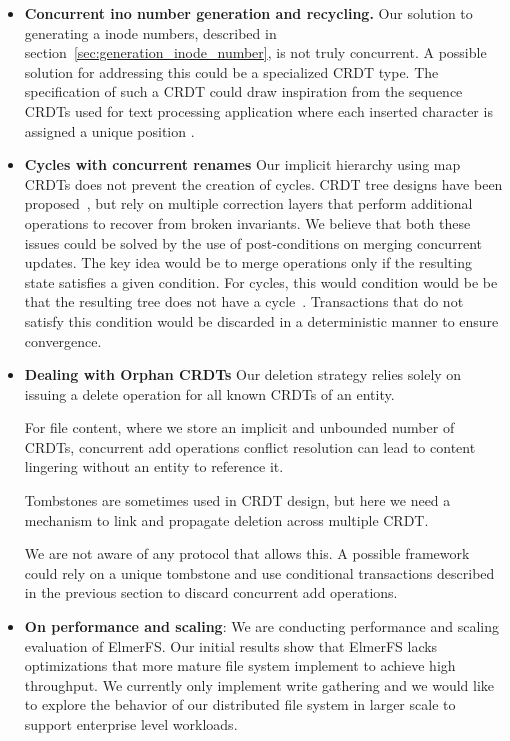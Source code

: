 \documentclass[sigconf, anonymous, 10pt]{acmart}
\begin{document}
\begin{itemize}
    \item \textbf{Concurrent ino number generation and recycling.}
    Our solution to generating a inode numbers, described in section~\ref{sec:generation_inode_number},
    is not truly concurrent.
    A possible solution for addressing this could be a specialized CRDT type.
    The specification of such a CRDT could draw inspiration from the sequence CRDTs
    used for text processing application where each inserted
    character is assigned a unique position \cite{nedelec2013lseq, letia2009crdts}.

    \item \textbf{Cycles with concurrent renames}
    Our implicit hierarchy using map CRDTs does not prevent the creation of cycles.
    CRDT tree designs have been proposed~\cite{martin2012abstract}\cite{ahmed2012file}, but rely on multiple correction
    layers that perform additional operations to recover from broken invariants.
    We believe that both these issues could be solved by the use of post-conditions on merging
    concurrent updates.
    The key idea would be to merge operations only if the resulting state satisfies a given condition.
    For cycles, this would condition would be be that the resulting tree does not have a cycle~\cite{nair:hal-03150817}.
    Transactions that do not satisfy this condition would be discarded in a deterministic manner to ensure convergence.

    \item \textbf{Dealing with Orphan CRDTs}
    Our deletion strategy relies solely on issuing a delete operation for all
    known CRDTs of an entity.

    For file content, where we store an implicit and unbounded number of CRDTs,
    concurrent add operations conflict resolution can lead to content lingering
    without an entity to reference it.

    Tombstones are sometimes used in CRDT design, but here we need a mechanism to link and propagate
    deletion across multiple CRDT.

    We are not aware of any protocol that allows this. A possible framework could rely on a unique tombstone and use conditional
    transactions described in the previous section to discard concurrent add operations.

    \item \textbf{On performance and scaling}: We are conducting performance and scaling evaluation of ElmerFS.
    Our initial results show that ElmerFS lacks optimizations that more mature file system implement to achieve high throughput.
    We currently only implement write gathering and we would like to explore the behavior of our distributed file system in larger scale to support enterprise level workloads.


\end{itemize}
\end{document}
